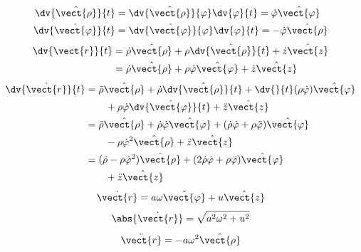 \begin{align*}
\dv{\hat{\vect{\rho}}}{t}&=\dv{\hat{\vect{\rho}}}{\varphi}\dv{\varphi}{t}=\dot{\varphi}\hat{\vect{\varphi}}\\
\dv{\hat{\vect{\varphi}}}{t}&=\dv{\hat{\vect{\varphi}}}{\varphi}\dv{\varphi}{t}=-\dot{\varphi}\hat{\vect{\rho}}
\end{align*}
\begin{align*}
\dv{\vect{r}}{t}&=\dot{\rho}\hat{\vect{\rho}}+\rho\dv{\hat{\vect{\rho}}}{t}+\dot{z}\hat{\vect{z}}\\
&=\dot{\rho}\hat{\vect{\rho}}+\rho\dot{\varphi}\hat{\vect{\varphi}}+\dot{z}\hat{\vect{z}}
\end{align*}
\begin{align*}
\dv{\dot{\vect{r}}}{t}&=\ddot{\rho}\hat{\vect{\rho}}+\dot{\rho}\dv{\hat{\vect{\rho}}}{t}+\dv{}{t}(\rho\dot{\varphi})\hat{\vect{\varphi}}\\
&\qquad+\rho\dot{\varphi}\dv{\hat{\vect{\varphi}}}{t}+\ddot{z}\hat{\vect{z}}\\
&=\ddot{\rho}\hat{\vect{\rho}}+\dot{\rho}\dot{\varphi}\hat{\vect{\varphi}}+(\dot{\rho}\dot{\varphi}+\rho\ddot{\varphi})\hat{\vect{\varphi}}\\
&\qquad-\rho\dot{\varphi}^{2}\hat{\vect{\rho}}+\ddot{z}\hat{\vect{z}}\\
&=(\ddot{\rho}-\rho\dot{\varphi}^{2})\hat{\vect{\rho}}+(2\dot{\rho}\dot{\varphi}+\rho\ddot{\varphi})\hat{\vect{\varphi}}\\
&\qquad+\ddot{z}\hat{\vect{z}}
\end{align*}
\[ \dot{\vect{r}}=a\omega\hat{\vect{\varphi}}+u\hat{\vect{z}} \]
\[ \abs{\dot{\vect{r}}}=\sqrt{a^{2}\omega^{2}+u^{2}} \]
\[ \ddot{\vect{r}}=-a\omega^{2}\hat{\vect{\rho}} \]
